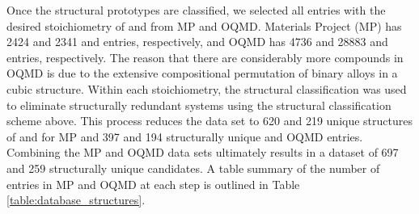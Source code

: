 %
%
Once the structural prototypes are classified,
we selected all entries with the desired stoichiometry of \ABtwo and \ABthree from MP and OQMD.
%
Materials Project (MP) has \num{2424} and \num{2341} \ABtwo and \ABthree entries, respectively,
and OQMD has \num{4736} and \num{28883} \ABtwo and \ABthree entries, respectively.
%
The reason that there are considerably more \ABthree compounds in OQMD is due to the extensive compositional permutation of binary alloys in a cubic \ABthree structure.
%
Within each stoichiometry, the structural classification was used to eliminate structurally redundant systems using the structural classification scheme above.
%
This process reduces the data set to \num{620} and \num{219} unique structures of \ABtwo and \ABthree for MP and \num{397} and \num{194} structurally unique \ABtwo and \ABthree OQMD entries.
%
Combining the MP and OQMD data sets ultimately results in a dataset of \num{697} \ABtwo and \num{259} \ABthree structurally unique candidates.
%
A table summary of the number of entries in MP and OQMD at each step is outlined in Table \ref{table:database_structures}.


